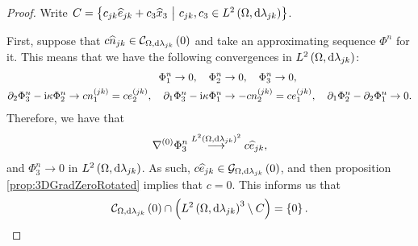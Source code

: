 \begin{proof}
	Write $C = \left\{  c_{jk}\widehat{e}_{jk} + c_3\widehat{x}_3 \ \middle\vert \  c_{jk},c_3\in L^{2}\left( \Omega,\mathrm{d} \lambda_{jk} \right)  \right\}$.
	
	First, suppose that $c\widehat{n}_{jk}\in\mathcal{C}_{ \Omega, \mathrm{d}\lambda_{jk}}\left( 0 \right)$ and take an approximating sequence $\Phi^n$ for it.
	This means that we have the following convergences in $L^{2}\left( \Omega,\mathrm{d} \lambda_{jk} \right)$:
	\begin{align*}
		\Phi^n_1 \rightarrow 0, \quad
		\Phi^n_2 &\rightarrow 0, \quad
		\Phi^n_3 \rightarrow 0, \\
		\partial_2\Phi^n_3 - \mathrm{i}\kappa\Phi^n_2 \rightarrow c n_1^{(jk)} = c e_2^{(jk)}, \quad
		\partial_1\Phi^n_3 - \mathrm{i}\kappa\Phi^n_1 &\rightarrow -c n_2^{(jk)} = c e_1^{(jk)}, \quad
		\partial_1\Phi^n_2 - \partial_2\Phi^n_1 \rightarrow 0.
	\end{align*}
	Therefore, we have that
	\begin{align*}
		\nabla^{(0)}\Phi^n_3 \overset{L^{2}\left( \Omega,\mathrm{d} \lambda_{jk} \right)^2}{\longrightarrow} c \widehat{e}_{jk},
	\end{align*}
	and $\Phi^n_3\rightarrow 0$ in $L^{2}\left( \Omega,\mathrm{d} \lambda_{jk} \right)$.
	As such, $c\widehat{e}_{jk}\in\mathcal{G}_{ \Omega, \mathrm{d}\lambda_{jk}}\left( 0 \right)$, and then proposition \ref{prop:3DGradZeroRotated} implies that $c=0$.
	This informs us that 
	\begin{align*}
		\mathcal{C}_{ \Omega, \mathrm{d}\lambda_{jk}}\left( 0 \right)\cap \left( L^{2}\left( \Omega,\mathrm{d} \lambda_{jk} \right)^3\setminus C \right) = \left\{ 0 \right\}.
	\end{align*}
	

\end{proof}
